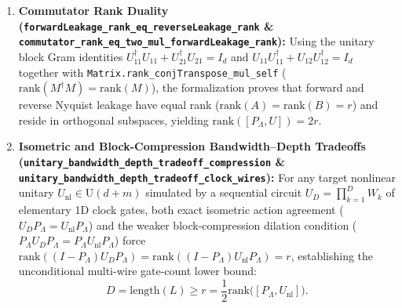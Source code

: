 \documentclass[11pt,a4paper]{article}
\theoremstyle{definition}
\begin{document}
\begin{enumerate}
\item \textbf{Commutator Rank Duality (\texttt{forwardLeakage\_\allowbreak{}rank\_\allowbreak{}eq\_\allowbreak{}reverseLeakage\_\allowbreak{}rank} \& \texttt{commutator\_\allowbreak{}rank\_\allowbreak{}eq\_\allowbreak{}two\_\allowbreak{}mul\_\allowbreak{}forwardLeakage\_\allowbreak{}rank}):} Using the unitary block Gram identities $U_{11}^\dagger U_{11} + U_{21}^\dagger U_{21} = I_d$ and $U_{11} U_{11}^\dagger + U_{12} U_{12}^\dagger = I_d$ together with \texttt{Matrix.rank\_\allowbreak{}conjTranspose\_\allowbreak{}mul\_\allowbreak{}self} ($\mathrm{rank}(M^\dagger M) = \mathrm{rank}(M)$), the formalization proves that forward and reverse Nyquist leakage have equal rank ($\mathrm{rank}(A) = \mathrm{rank}(B) = r$) and reside in orthogonal subspaces, yielding $\mathrm{rank}([P_{\Lambda}, U]) = 2r$.
\item \textbf{Isometric and Block-Compression Bandwidth--Depth Tradeoffs (\texttt{unitary\_\allowbreak{}bandwidth\_\allowbreak{}depth\_\allowbreak{}tradeoff\_\allowbreak{}compression} \& \texttt{unitary\_\allowbreak{}bandwidth\_\allowbreak{}depth\_\allowbreak{}tradeoff\_\allowbreak{}clock\_\allowbreak{}wires}):} For any target nonlinear unitary $U_{\text{nl}} \in \mathrm{U}(d + m)$ simulated by a sequential circuit $U_D = \prod_{k=1}^D W_k$ of elementary 1D clock gates, both exact isometric action agreement ($U_D P_{\Lambda} = U_{\text{nl}} P_{\Lambda}$) and the weaker block-compression dilation condition ($P_{\Lambda} U_D P_{\Lambda} = P_{\Lambda} U_{\text{nl}} P_{\Lambda}$) force $\mathrm{rank}((I - P_{\Lambda}) U_D P_{\Lambda}) = \mathrm{rank}((I - P_{\Lambda}) U_{\text{nl}} P_{\Lambda}) = r$, establishing the unconditional multi-wire gate-count lower bound:
\begin{equation}
D = \mathrm{length}(L) \ge r = \frac{1}{2} \mathrm{rank}\big([P_{\Lambda}, U_{\text{nl}}]\big).
\end{equation}
\end{enumerate}
\end{document}
